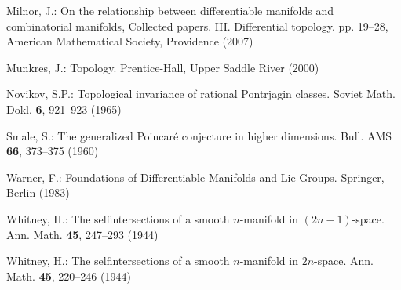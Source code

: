 \begin{description}[style=multiline,leftmargin=5em,labelwidth=4.5em,font=\normalfont]
\item[{[Mil07]}]Milnor, J.: On the relationship between differentiable manifolds and combinatorial manifolds, Collected papers. III. Differential topology. pp. 19–28, American Mathematical Society, Providence (2007)
\item[{[Mun00]}]Munkres, J.: Topology. Prentice-Hall, Upper Saddle River (2000)
\item[{[Nov65]}]Novikov, S.P.: Topological invariance of rational Pontrjagin classes. Soviet Math. Dokl. \textbf{6}, 921–923 (1965)
\item[{[Sma60]}]Smale, S.: The generalized Poincaré conjecture in higher dimensions. Bull. AMS \textbf{66}, 373–375 (1960)
\item[{[War83]}]Warner, F.: Foundations of Differentiable Manifolds and Lie Groups. Springer, Berlin (1983)
\item[{[Whi44a]}]Whitney, H.: The selfintersections of a smooth $n$-manifold in $(2n-1)$-space. Ann. Math. \textbf{45}, 247–293 (1944)
\item[{[Whi44b]}]Whitney, H.: The selfintersections of a smooth $n$-manifold in $2n$-space. Ann. Math. \textbf{45}, 220–246 (1944)
\end{description}
